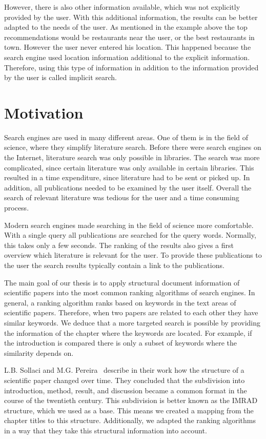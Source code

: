 However, there is also other information available, which was not explicitly provided by the user. With this additional information, the results can be better adapted to the needs of the user. As mentioned in the example above the top recommendations would be restaurants near the user, or the best restaurants in town. However the user never entered his location. This happened because the search engine used location information additional to the explicit information. Therefore, using this type of information in addition to the information provided by the user is called implicit search.

\section{Motivation}
\label{sec:Motivation}

Search engines are used in many different areas. One of them is in the field of science, where they simplify literature search. Before there were search engines on the Internet, literature search was only possible in libraries. The search was more complicated, since certain literature was only available in certain libraries. This resulted in a time expenditure, since literature had to be sent or picked up. In addition, all publications needed to be examined by the user itself. Overall the search of relevant literature was tedious for the user and a time consuming process.

Modern search engines made searching in the field of science more comfortable. With a single query all publications are searched for the query words. Normally, this takes only a few seconds. The ranking of the results also gives a first overview which literature is relevant for the user. To provide these publications to the user the search results typically contain a link to the publications.

The main goal of our thesis is to apply structural document information of scientific papers into the most common ranking algorithms of search engines. In general, a ranking algorithm ranks based on keywords in the text areas of scientific papers. Therefore, when two papers are related to each other they have similar keywords. We deduce that a more targeted search is possible by providing the information of the chapter where the keywords are located. For example, if the introduction is compared there is only a subset of keywords where the similarity depends on.

 L.B. Sollaci and M.G. Pereira~\cite{Sollaci-The-2004} describe in their work how the structure of a scientific paper changed over time. They concluded that the subdivision into introduction, method, result, and discussion became a common format in the course of the twentieth century. This subdivision is better known as the IMRAD structure, which we used as a base. This means we created a mapping from the chapter titles to this structure. Additionally, we adapted the ranking algorithms in a way that they take this structural information into account.

